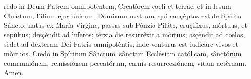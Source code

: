 redo in Deum Patrem omnipotèntem, Creatórem coeli et terrae, et in Įesum Chrîstum, Fílium eįus únicum, Dóminum nostrum, qui conçèptus est de Spíritu Sâncto, natus ex María Vìrģine, passus sub Pònzio Piláto, cruçifîxus, mòrtuus, et sepùltus; desçèndit ad ìnferos; tèrzia die resurrêxit a mòrtuīs; asçèndit ad coelos, sèdet ad dèxteram Dei Patris omnipotèntis; inde ventúrus est iudicáre vivos et mòrtuos. Credo in Spíritum Sânctum, sânctam Ecclésiam cațólicam, sânctórum communiónem, remissiónem peccatórum, carnis resurrecziónem, vitam aetèrnam. Amen.
